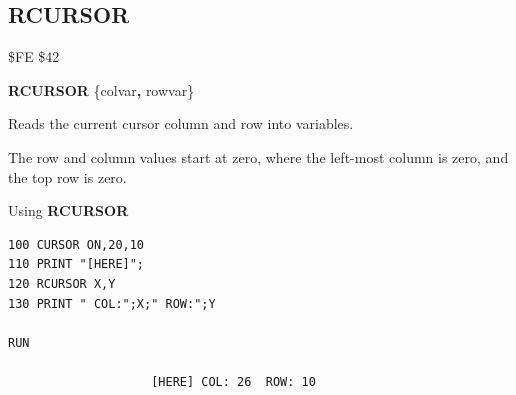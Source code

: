 
\newpage
\subsection{RCURSOR}
\begin{description}[leftmargin=2cm,style=nextline]
\item [Token:] \$FE \$42
\item [Format:] {\bf RCURSOR} \{colvar{\bf,} rowvar\}
\item [Usage:]  Reads the current cursor column and row into variables.

\item [Remarks:] The row and column values start at zero, where
                 the left-most column is zero, and the top row is zero.

\item [Example:] Using {\bf RCURSOR}

\begin{tcolorbox}[colback=black,coltext=white]
\verbatimfont{\codefont}
\begin{verbatim}
100 CURSOR ON,20,10
110 PRINT "[HERE]";
120 RCURSOR X,Y
130 PRINT " COL:";X;" ROW:";Y

RUN

                    [HERE] COL: 26  ROW: 10
\end{verbatim}
\end{tcolorbox}
\end{description}


\newpage
